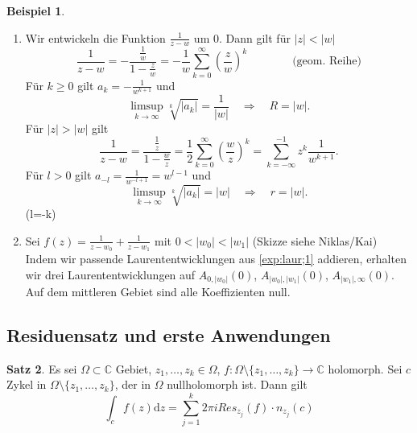 \documentclass[11pt,titlepage]{article}
\theoremstyle{definition}
\newtheorem{theorem}{Satz}[section]
\newtheorem{example}[theorem]{Beispiel}
\theoremstyle{remark}
\begin{document}
	\begin{example}
		\begin{enumerate}
			\item \label{exp:laur;1} Wir entwickeln die Funktion $\frac{1}{z-w}$ um $0$. Dann gilt für $|z|<|w|$
			\[ \frac{1}{z-w} = -\frac{\frac{1}{w}}{1-\frac{z}{w}}=-\frac{1}{w} \sum_{k=0}^{\infty} 
			\left(\frac{z}{w}\right)^k \qquad \qquad \text{(geom. Reihe)} \]
			Für $k\geq 0$ gilt $a_k=-\frac{1}{w^{k+1}}$ und 
			\[ \limsup_{k\to\infty}\sqrt[k]{|a_k|} =\frac{1}{|w|} \quad\Rightarrow\quad R=|w|. \]
			Für $|z|>|w|$ gilt
			\[ \frac{1}{z-w}=\frac{\frac{1}{z}}{1-\frac{w}{z}} =\frac{1}{2}\sum_{k=0}^{\infty}\left(\frac{w}{z}\right)^k 
			=\sum_{k=-\infty}^{-1} z^k \frac{1}{w^{k+1}}. \]
			Für $l>0$ gilt $a_{-l}=\frac{1}{w^{-l+1}}=w^{l-1}$ und
			\[ \limsup_{k\to\infty}\sqrt[k]{|a_k|}=|w| \quad\Rightarrow\quad r=|w|. \]
			(l=-k)
			
			\item Sei $f(z)=\frac{1}{z-w_0}+\frac{1}{z-w_1}$ mit $0<|w_0|<|w_1|$ (Skizze siehe Niklas/Kai) \\
			Indem wir passende Laurententwicklungen aus \ref{exp:laur;1} addieren, erhalten wir drei 
			Laurententwicklungen auf $A_{0,|w_0|}(0)$, $A_{|w_0|,|w_1|}(0)$, $A_{|w_1|,\infty}(0)$. 
			Auf dem mittleren Gebiet sind alle Koeffizienten null.
		\end{enumerate}
	\end{example}
	
	
	
	
	
	
	
	\subsection{Residuensatz und erste Anwendungen}
	
	\begin{theorem}
		Es sei $\Omega\subset\mathbb{C}$ Gebiet, $z_1,\ldots ,z_k\in\Omega$, $f:\Omega\setminus
		\{z_1,\ldots ,z_k\}\to\mathbb{C}$ holomorph. Sei $c$ Zykel in $\Omega\setminus\{z_1,\ldots,z_k\}$, 
		der in $\Omega$ nullholomorph ist. Dann gilt
		\[ \int_c f(z)\mathrm{d}z =\sum_{j=1}^k 2\pi i Res_{z_j}(f)\cdot n_{z_j}(c) \]
	\end{theorem}
	
\end{document}
